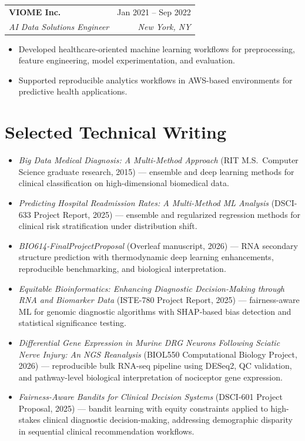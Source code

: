 \documentclass[11pt]{article}
\makeatletter
\newcommand{\entry}[4]{
  \noindent\begin{tabularx}{\textwidth}{@{}Xr@{}}
    \textbf{#1} & #2 \\
    \textit{#3} & \textit{#4}
  \end{tabularx}\vspace{2pt}
}
\makeatother
\begin{document}
\entry{VIOME Inc.}{Jan 2021 -- Sep 2022}{AI Data Solutions Engineer}{New York, NY}
\begin{itemize}
  \item Developed healthcare-oriented machine learning workflows for preprocessing, feature engineering, model experimentation, and evaluation.
  \item Supported reproducible analytics workflows in AWS-based environments for predictive health applications.
\end{itemize}

\section{Selected Technical Writing}
\begin{itemize}
  \item \textit{Big Data Medical Diagnosis: A Multi-Method Approach} (RIT M.S.\ Computer Science graduate research, 2015) --- ensemble and deep learning methods for clinical classification on high-dimensional biomedical data.
  \item \textit{Predicting Hospital Readmission Rates: A Multi-Method ML Analysis} (DSCI-633 Project Report, 2025) --- ensemble and regularized regression methods for clinical risk stratification under distribution shift.
  \item \textit{BIO614-FinalProjectProposal} (Overleaf manuscript, 2026) --- RNA secondary structure prediction with thermodynamic deep learning enhancements, reproducible benchmarking, and biological interpretation.
  \item \textit{Equitable Bioinformatics: Enhancing Diagnostic Decision-Making through RNA and Biomarker Data} (ISTE-780 Project Report, 2025) --- fairness-aware ML for genomic diagnostic algorithms with SHAP-based bias detection and statistical significance testing.
  \item \textit{Differential Gene Expression in Murine DRG Neurons Following Sciatic Nerve Injury: An NGS Reanalysis} (BIOL550 Computational Biology Project, 2026) --- reproducible bulk RNA-seq pipeline using DESeq2, QC validation, and pathway-level biological interpretation of nociceptor gene expression.
  \item \textit{Fairness-Aware Bandits for Clinical Decision Systems} (DSCI-601 Project Proposal, 2025) --- bandit learning with equity constraints applied to high-stakes clinical diagnostic decision-making, addressing demographic disparity in sequential clinical recommendation workflows.
\end{itemize}
\end{document}

